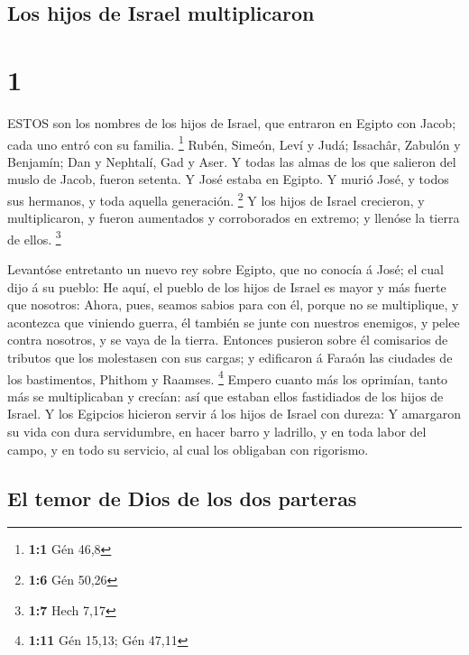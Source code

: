 \hypertarget{los-hijos-de-israel-multiplicaron}{%
\subsection{Los hijos de Israel
multiplicaron}\label{los-hijos-de-israel-multiplicaron}}

\hypertarget{section}{%
\section{1}\label{section}}

 ESTOS son los nombres de los hijos de Israel, que entraron
en Egipto con Jacob; cada uno entró con su familia. \footnote{\textbf{1:1}
  Gén 46,8}  Rubén, Simeón, Leví y Judá; 
Issachâr, Zabulón y Benjamín;  Dan y Nephtalí, Gad y Aser.
 Y todas las almas de los que salieron del muslo de Jacob,
fueron setenta. Y José estaba en Egipto.  Y murió José, y
todos sus hermanos, y toda aquella generación. \footnote{\textbf{1:6}
  Gén 50,26}  Y los hijos de Israel crecieron, y
multiplicaron, y fueron aumentados y corroborados en extremo; y llenóse
la tierra de ellos. \footnote{\textbf{1:7} Hech 7,17}

 Levantóse entretanto un nuevo rey sobre Egipto, que no
conocía á José; el cual dijo á su pueblo:  He aquí, el
pueblo de los hijos de Israel es mayor y más fuerte que nosotros:
 Ahora, pues, seamos sabios para con él, porque no se
multiplique, y acontezca que viniendo guerra, él también se junte con
nuestros enemigos, y pelee contra nosotros, y se vaya de la tierra.
 Entonces pusieron sobre él comisarios de tributos que los
molestasen con sus cargas; y edificaron á Faraón las ciudades de los
bastimentos, Phithom y Raamses. \footnote{\textbf{1:11} Gén 15,13; Gén
  47,11}  Empero cuanto más los oprimían, tanto más se
multiplicaban y crecían: así que estaban ellos fastidiados de los hijos
de Israel.  Y los Egipcios hicieron servir á los hijos de
Israel con dureza:  Y amargaron su vida con dura
servidumbre, en hacer barro y ladrillo, y en toda labor del campo, y en
todo su servicio, al cual los obligaban con rigorismo.

\hypertarget{el-temor-de-dios-de-los-dos-parteras}{%
\subsection{El temor de Dios de los dos
parteras}\label{el-temor-de-dios-de-los-dos-parteras}}

